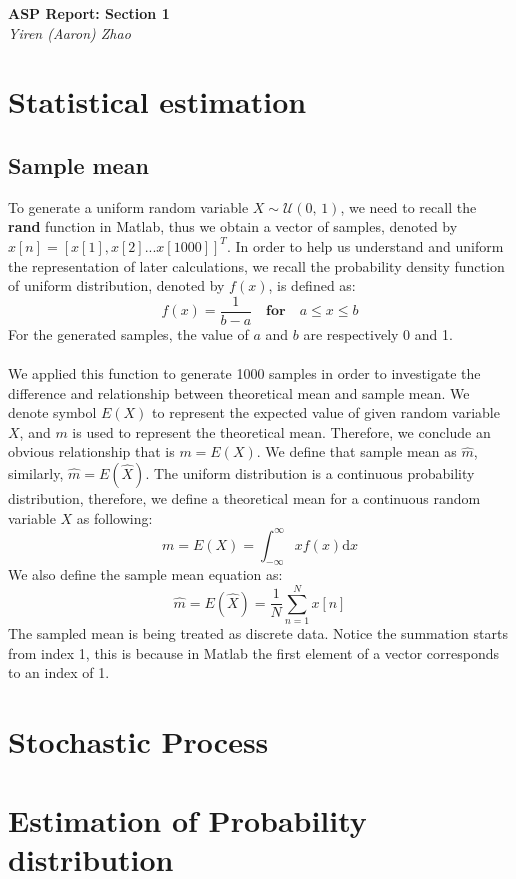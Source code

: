 \documentclass[11pt]{article}
\begin{document}
\begin{titlepage}
	\begin{center}
		\Large\textbf{ASP Report: Section 1}\\
		\large\textit{Yiren (Aaron) Zhao}
	\end{center}
\end{titlepage}

\section{Statistical estimation}
\subsection{Sample mean}
To generate a uniform random variable $X\sim\mathcal{U}(0,\,1)$, we need to recall the \textbf{rand} function in Matlab, thus we obtain a vector of samples, denoted by $x[n] = [x[1],x[2]...x[1000]]^{T}$. In order to help us understand and uniform the representation of later calculations, we recall the probability density function of uniform distribution, denoted by $f(x)$, is defined as: \\
\begin{equation}
f(x) = \frac{1}{b-a} \quad \textbf{for} \quad a \leq x \leq b
\end{equation}  
For the generated samples, the value of $a$ and $b$ are respectively 0 and 1.\\
\\
We applied this function to generate 1000 samples in order to investigate the difference and relationship between theoretical mean and sample mean. We denote symbol $E(X)$ to represent the expected value of given random variable $X$, and $m$ is used to represent the theoretical mean. Therefore, we conclude an obvious relationship that is $m = E(X)$. We define that sample mean as $\hat{m}$, similarly, $\hat{m} = E(\hat{X})$. The uniform distribution is a continuous probability distribution, therefore, we define a theoretical mean for a continuous random variable $X$ as following:\\
\begin{equation}
m = E(X)=\int_{-\infty}^\infty xf(x) \mathrm{d}x
\end{equation}
We also define the sample mean equation as:\\
\begin{equation}
\hat{m} = E(\hat{X}) = \frac{1}{N} \sum_{n=1}^{N} x[n]
\end{equation}
The sampled mean is being treated as discrete data. Notice the summation starts from index 1, this is because in Matlab the first element of a vector corresponds to an index of 1. 



\section{Stochastic Process}
\section{Estimation of Probability distribution}
\end{document}
